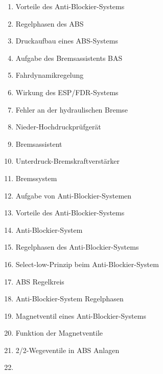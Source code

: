 \begin{enumerate}
\item
  Vorteile des Anti-Blockier-Systems\\
\item
  Regelphasen des ABS\\
\item
  Druckaufbau eines ABS-Systems\\
\item
  Aufgabe des Bremsassistents BAS\\
\item
  Fahrdynamikregelung\\
\item
  Wirkung des ESP/FDR-Systems\\
\item
  Fehler an der hydraulischen Bremse\\
\item
  Nieder-Hochdruckprüfgerät\\
\item
  Bremsassistent\\
\item
  Unterdruck-Bremskraftverstärker\\
\item
  Bremssystem\\
\item
  Aufgabe von Anti-Blockier-Systemen\\
\item
  Vorteile des Anti-Blockier-Systems\\
\item
  Anti-Blockier-System\\
\item
  Regelphasen des Anti-Blockier-Systems\\
\item
  Select-low-Prinzip beim Anti-Blockier-System\\
\item
  ABS Regelkreis\\
\item
  Anti-Blockier-System Regelphasen\\
\item
  Magnetventil eines Anti-Blockier-Systems\\
\item
  Funktion der Magnetventile\\
\item
  2/2-Wegeventile in ABS Anlagen\\
\item

\end{enumerate}

